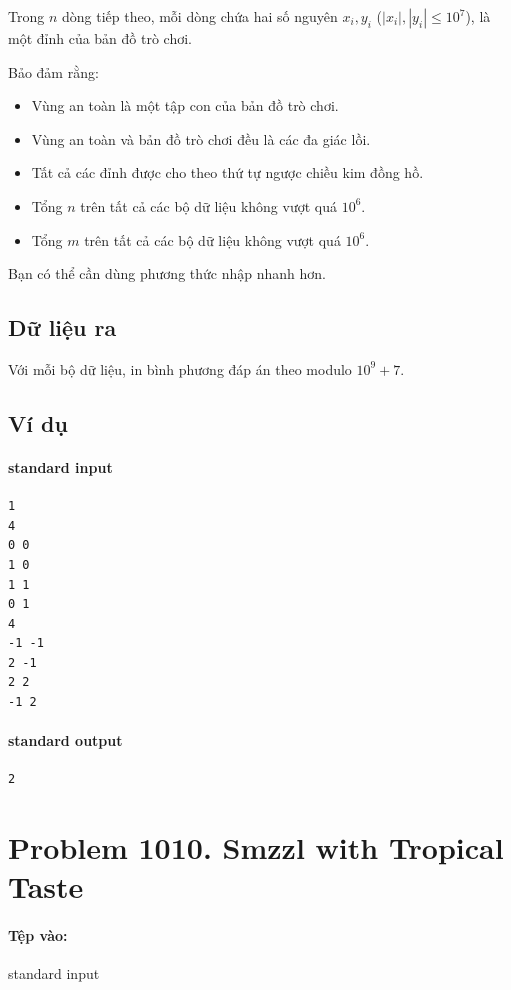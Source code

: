 \documentclass[11pt]{article}
\begin{document}
Trong \(n\) dòng tiếp theo, mỗi dòng chứa hai số nguyên \(x_i,y_i\)
(\(|x_i|,|y_i|\le 10^7\)), là một đỉnh của bản đồ trò chơi.

Bảo đảm rằng:

\begin{itemize}
  \item Vùng an toàn là một tập con của bản đồ trò chơi.
  \item Vùng an toàn và bản đồ trò chơi đều là các đa giác lồi.
  \item Tất cả các đỉnh được cho theo thứ tự ngược chiều kim đồng hồ.
  \item Tổng \(n\) trên tất cả các bộ dữ liệu không vượt quá \(10^6\).
  \item Tổng \(m\) trên tất cả các bộ dữ liệu không vượt quá \(10^6\).
\end{itemize}

Bạn có thể cần dùng phương thức nhập nhanh hơn.

\subsection*{Dữ liệu ra}

Với mỗi bộ dữ liệu, in bình phương đáp án theo modulo \(10^9+7\).

\subsection*{Ví dụ}

\paragraph{standard input}
\begin{verbatim}
1
4
0 0
1 0
1 1
0 1
4
-1 -1
2 -1
2 2
-1 2
\end{verbatim}

\paragraph{standard output}
\begin{verbatim}
2
\end{verbatim}

\section{Problem 1010. Smzzl with Tropical Taste}

\paragraph{Tệp vào:} standard input
\end{document}
